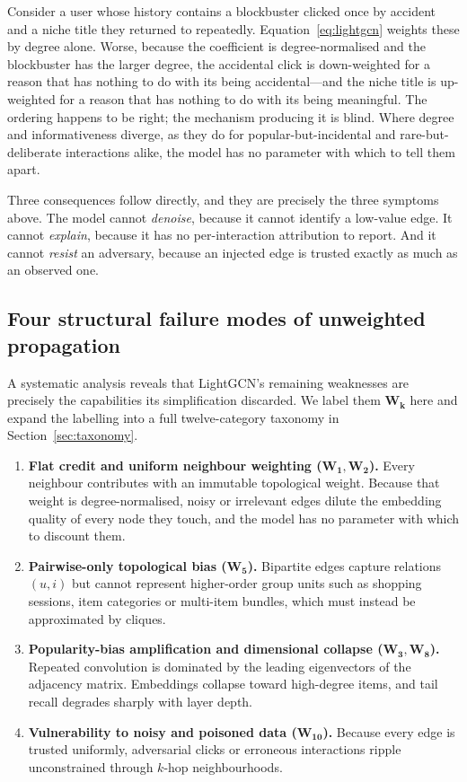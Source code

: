 \documentclass[final,5p,times,twocolumn]{elsarticle}
\begin{document}
Consider a user whose history contains a blockbuster clicked once by accident
and a niche title they returned to repeatedly. Equation~\eqref{eq:lightgcn}
weights these by degree alone. Worse, because the coefficient is
degree-normalised and the blockbuster has the larger degree, the accidental
click is down-weighted for a reason that has nothing to do with its being
accidental---and the niche title is up-weighted for a reason that has nothing
to do with its being meaningful. The ordering happens to be right; the
mechanism producing it is blind. Where degree and informativeness diverge, as
they do for popular-but-incidental and rare-but-deliberate interactions alike,
the model has no parameter with which to tell them apart.

Three consequences follow directly, and they are precisely the three symptoms
above. The model cannot \emph{denoise}, because it cannot identify a
low-value edge. It cannot \emph{explain}, because it has no per-interaction
attribution to report. And it cannot \emph{resist} an adversary, because an
injected edge is trusted exactly as much as an observed one.

\subsection{Four structural failure modes of unweighted propagation}
\label{sec:failuremodes}

A systematic analysis reveals that LightGCN's remaining weaknesses are
precisely the capabilities its simplification discarded. We label them
$\mathbf{W_k}$ here and expand the labelling into a full twelve-category
taxonomy in Section~\ref{sec:taxonomy}.

\begin{enumerate}
\item \textbf{Flat credit and uniform neighbour weighting
($\mathbf{W_1}, \mathbf{W_2}$).} Every neighbour contributes with an immutable
topological weight. Because that weight is degree-normalised, noisy or
irrelevant edges dilute the embedding quality of every node they touch, and
the model has no parameter with which to discount them.

\item \textbf{Pairwise-only topological bias ($\mathbf{W_5}$).} Bipartite
edges capture relations $(u,i)$ but cannot represent higher-order group units
such as shopping sessions, item categories or multi-item bundles, which must
instead be approximated by cliques.

\item \textbf{Popularity-bias amplification and dimensional collapse
($\mathbf{W_3}, \mathbf{W_8}$).} Repeated convolution is dominated by the
leading eigenvectors of the adjacency matrix. Embeddings collapse toward
high-degree items, and tail recall degrades sharply with layer depth.

\item \textbf{Vulnerability to noisy and poisoned data ($\mathbf{W_{10}}$).}
Because every edge is trusted uniformly, adversarial clicks or erroneous
interactions ripple unconstrained through $k$-hop neighbourhoods.
\end{enumerate}
\end{document}
